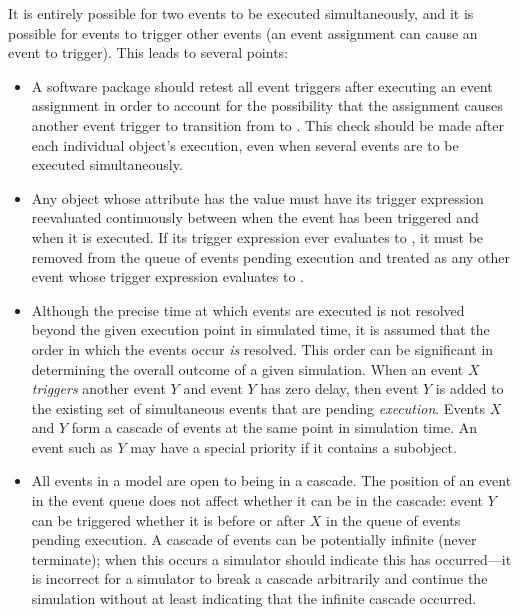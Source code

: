 It is entirely possible for two events to be executed
simultaneously, and it is possible for events to trigger other events
(\ie an event assignment can cause an event to trigger).  This leads
to several points:
\begin{itemize}

\item A software package should retest all event triggers after
  executing an event assignment in order to account for the
  possibility that the assignment causes another event trigger to
  transition from  to .  This check should be
  made after each individual \Event object's execution, even when
  several events are to be executed simultaneously.  

\item Any \Event object whose \Trigger {}
  attribute has the value  must have its trigger
  expression reevaluated continuously between when the event has
  been triggered and when it is executed.  If its trigger expression
  ever evaluates to , it must be removed from the queue
  of events pending execution and treated as any other event whose
  trigger expression evaluates to .

\item Although the precise time at which events are executed is
  not resolved beyond the given execution point in simulated time,
  it is assumed that the order in which the events occur \emph{is}
  resolved.  This order can be significant in determining the
  overall outcome of a given simulation.  When an event $X$
  \emph{triggers} another event $Y$ and event $Y$ has zero delay,
  then event $Y$ is added to the existing set of simultaneous
  events that are pending \emph{execution}.  Events $X$ and $Y$
  form a cascade of events at the same point in simulation time.
  An event such as $Y$ may have a special priority if it contains
  a \Priority subobject.

\item All events in a model are open to being in a cascade.  The
  position of an event in the event queue does not affect whether
  it can be in the cascade: event $Y$ can be triggered whether it
  is before or after $X$ in the queue of events pending execution.
  A cascade of events can be potentially infinite (never
  terminate); when this occurs a simulator should indicate this
  has occurred---it is incorrect for a simulator to break a
  cascade arbitrarily and continue the simulation without at least
  indicating that the infinite cascade occurred.


\end{itemize}
